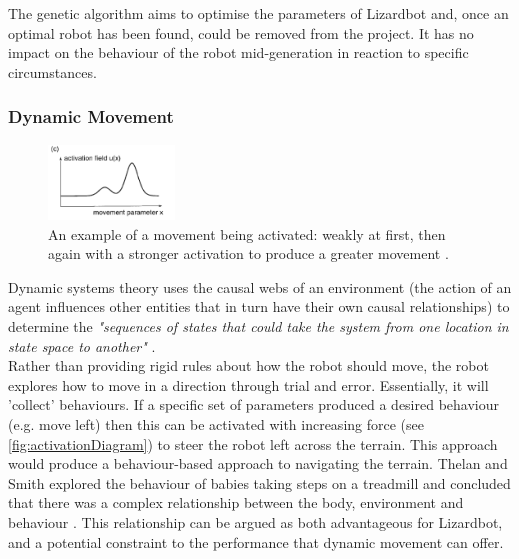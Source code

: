 \documentclass{article}
\begin{document}
The genetic algorithm aims to optimise the parameters of Lizardbot and, once an optimal robot has been found, could be removed from the project. It has no impact on the behaviour of the robot mid-generation in reaction to specific circumstances.\\

\newpage
\subsubsection{Dynamic Movement}
\label{sec:DST Aims}
\begin{figure}
    \centering
    \vspace*{-5mm}
    \includegraphics[width=0.3\textwidth]{activationExample}
    \caption{An example of a movement being activated: weakly at first, then again with a stronger activation to produce a greater movement \citep{dft}.}
    \label{fig:activationDiagram}
\end{figure}
Dynamic systems theory uses the causal webs of an environment (the action of an agent influences other entities that in turn have their own causal relationships) to determine the \textit{"sequences of states that could take the system from one location in state space to another"} .\\
Rather than providing rigid rules about how the robot should move, the robot explores how to move in a direction through trial and error. Essentially, it will 'collect' behaviours. If a specific set of parameters produced a desired behaviour (e.g. move left) then this can be activated with increasing force (see \autoref{fig:activationDiagram}) to steer the robot left across the terrain. This approach would produce a behaviour-based approach to navigating the terrain. Thelan and Smith explored the behaviour of babies taking steps on a treadmill and concluded that there was a complex relationship between the body, environment and behaviour . This relationship can be argued as both advantageous for Lizardbot, and a potential constraint to the performance that dynamic movement can offer.\\
\end{document}
